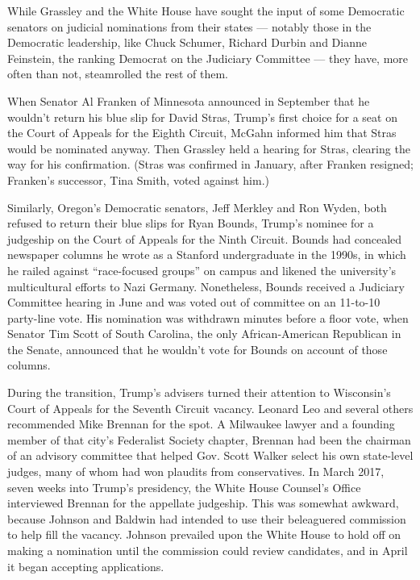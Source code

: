 While Grassley and the White House have sought the input of some
Democratic senators on judicial nominations from their states ---
notably those in the Democratic leadership, like Chuck Schumer, Richard
Durbin and Dianne Feinstein, the ranking Democrat on the Judiciary
Committee --- they have, more often than not, steamrolled the rest of
them.

When Senator Al Franken of Minnesota announced in September that he
wouldn't return his blue slip for David Stras, Trump's first choice for
a seat on the Court of Appeals for the Eighth Circuit, McGahn informed
him that Stras would be nominated anyway. Then Grassley held a hearing
for Stras, clearing the way for his confirmation. (Stras was confirmed
in January, after Franken resigned; Franken's successor, Tina Smith,
voted against him.)

Similarly, Oregon's Democratic senators, Jeff Merkley and Ron Wyden,
both refused to return their blue slips for Ryan Bounds, Trump's nominee
for a judgeship on the Court of Appeals for the Ninth Circuit. Bounds
had concealed newspaper columns he wrote as a Stanford undergraduate in
the 1990s, in which he railed against ``race-focused groups'' on campus
and likened the university's multicultural efforts to Nazi Germany.
Nonetheless, Bounds received a Judiciary Committee hearing in June and
was voted out of committee on an 11-to-10 party-line vote. His
nomination was withdrawn minutes before a floor vote, when Senator Tim
Scott of South Carolina, the only African-American Republican in the
Senate, announced that he wouldn't vote for Bounds on account of those
columns.

During the transition, Trump's advisers turned their attention to
Wisconsin's Court of Appeals for the Seventh Circuit vacancy. Leonard
Leo and several others recommended Mike Brennan for the spot. A
Milwaukee lawyer and a founding member of that city's Federalist Society
chapter, Brennan had been the chairman of an advisory committee that
helped Gov. Scott Walker select his own state-level judges, many of whom
had won plaudits from conservatives. In March 2017, seven weeks into
Trump's presidency, the White House Counsel's Office interviewed Brennan
for the appellate judgeship. This was somewhat awkward, because Johnson
and Baldwin had intended to use their beleaguered commission to help
fill the vacancy. Johnson prevailed upon the White House to hold off on
making a nomination until the commission could review candidates, and in
April it began accepting applications.

